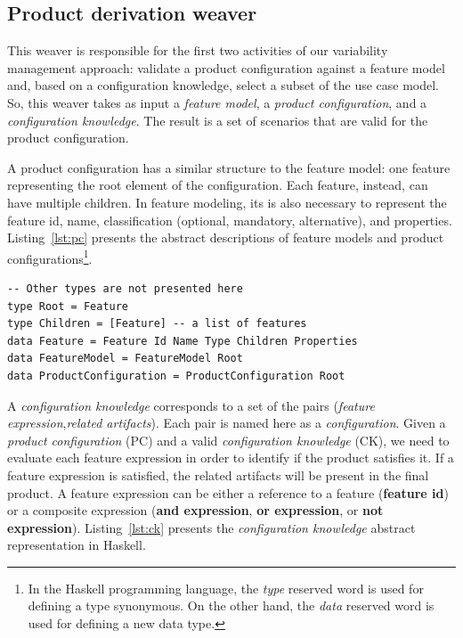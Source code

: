 \subsection{Product derivation weaver}\label{sub:pd-weaver}

This weaver is responsible for the first two activities of our 
variability management approach: validate a product configuration 
against  a feature model and, based on a configuration knowledge, select 
a subset of the use case model. So, this weaver takes as input a
\emph{feature model}, a \emph{product configuration}, and a \emph{configuration knowledge}.
The result is a set of scenarios that are valid for the product configuration.

A product configuration has a similar structure to the feature model:
one feature representing the root element of the configuration. Each
feature, instead, can have multiple children. In feature modeling,
its is also necessary to represent the feature id, name,
classification (optional, mandatory, alternative), and properties.
Listing~\ref{lst:pc} presents the abstract descriptions of feature models 
and product configurations\footnote{In the Haskell programming language, the
\emph{type} reserved word is used for defining a type synonymous. On
the other hand, the \emph{data }reserved word is used for defining a
new data type.}.

\begin{lstlisting}[belowskip=20pt,frame=tb,caption={Product Configuration},label=lst:pc]
-- Other types are not presented here
type Root = Feature
type Children = [Feature] -- a list of features
data Feature = Feature Id Name Type Children Properties
data FeatureModel = FeatureModel Root
data ProductConfiguration = ProductConfiguration Root
\end{lstlisting}

A \emph{configuration knowledge} corresponds 
to a set of the pairs (\emph{feature expression},\emph{related artifacts}). 
Each pair is named here as a \emph{configuration}. Given a
\emph{product configuration} (PC) and a valid \emph{configuration
knowledge} (CK), we need to evaluate each feature expression in
order to identify if the product satisfies it. If a feature
expression is satisfied, the related artifacts will be present in the
final product. A feature expression can be either a reference to a
feature ({\bf feature id}) or a composite expression ({\bf and expression}, 
{\bf or expression}, or {\bf not expression}). Listing~\ref{lst:ck}
presents the \emph{configuration knowledge} abstract representation in Haskell.

